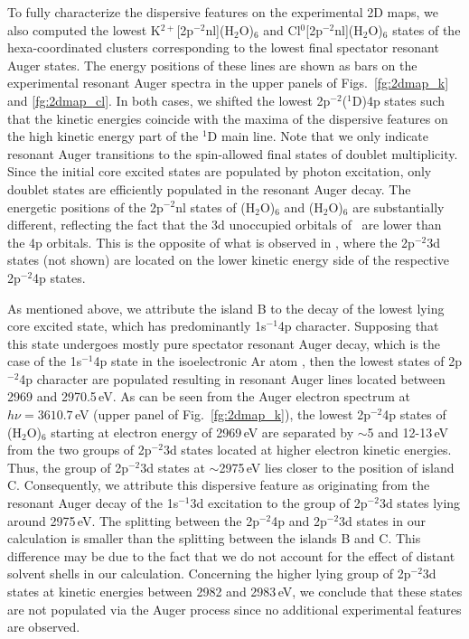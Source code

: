 To fully characterize the dispersive features on the experimental 2D maps, we also computed the lowest K$^{2+}$[2p$^{-2}$nl](H$_2$O)$_6$ and Cl$^{0}$[2p$^{-2}$nl](H$_2$O)$_6$ states of the hexa-coordinated clusters corresponding to the lowest final spectator resonant Auger states. The energy positions of these lines are shown as bars on the experimental resonant Auger spectra in the upper panels of Figs.\ \ref{fg:2dmap_k} and \ref{fg:2dmap_cl}. In both cases, we shifted the lowest 2p$^{-2}$($^1$D)4p states such that the kinetic energies coincide with the maxima of the dispersive features on the high kinetic energy part of the $^1$D main line. Note that we only indicate resonant Auger transitions to the spin-allowed final states of doublet multiplicity. Since the initial core excited states are populated by photon excitation, only doublet states are efficiently populated in the resonant Auger decay. The energetic positions of the 2p$^{-2}$nl states of \ki(H$_2$O)$_6$ and \cli(H$_2$O)$_6$ are substantially different, reflecting the fact that the 3d unoccupied orbitals of \ki~are lower than the 4p orbitals. This is the opposite of what is observed in \cli, where the 2p$^{-2}$3d states (not shown) are located on the lower kinetic energy side of the respective 2p$^{-2}$4p states.


As mentioned above, we attribute the island B to the decay of the lowest lying core excited state, which has predominantly 1s$^{-1}$4p character. Supposing that this state undergoes mostly pure spectator resonant Auger decay, which is the case of the 1s$^{-1}$4p state in the isoelectronic Ar atom \citep{ceolin15:022502}, then the lowest states of 2p$^{-2}$4p character are populated resulting in resonant Auger lines located between 2969 and 2970.5\,eV. As can be seen from the Auger electron spectrum at $h\nu = 3610.7$\,eV (upper panel of Fig.\ \ref{fg:2dmap_k}), the lowest 2p$^{-2}$4p states of \ki(H$_2$O)$_6$ starting at electron energy of 2969\,eV are separated by $\sim$5 and 12-13\,eV from the two groups of 2p$^{-2}$3d states located at higher electron kinetic energies. Thus, the group of 2p$^{-2}$3d states at $\sim$2975\,eV lies closer to the position of island C. Consequently, we attribute this dispersive feature as originating from the resonant Auger decay of the 1s$^{-1}$3d excitation to the group of 2p$^{-2}$3d states lying around 2975\,eV. The splitting between the 2p$^{-2}$4p and 2p$^{-2}$3d states in our calculation is smaller than the splitting between the islands B and C. This difference may be due to the fact that we do not account for the effect of distant solvent shells in our calculation. Concerning the higher lying group of 2p$^{-2}$3d states at kinetic energies between 2982 and 2983\,eV, we conclude that these states are not populated via the Auger process since no additional experimental features are observed.


